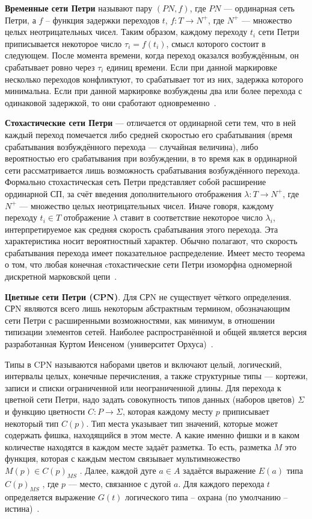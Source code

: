 \textbf{Временные сети Петри} называют пару $(PN, f)$, где $PN$ --- ординарная сеть Петри, а $f$ – функция задержки переходов $t$, $f : T \rightarrow N^+$, где $N^+$ --- множество целых неотрицательных чисел. Таким образом, каждому переходу $t_i$ сети Петри приписывается некоторое число $\tau_i = f(t_i)$, смысл которого состоит в следующем. После момента времени, когда переход оказался возбуждённым, он срабатывает ровно через $\tau_i$  единиц времени. Если при данной маркировке несколько переходов конфликтуют, то срабатывает тот из них, задержка которого минимальна. Если при данной маркировке возбуждены два или более перехода с одинаковой задержкой, то они сработают одновременно~\cite{timed_petri}.

\textbf{Стохастические сети Петри} --- отличается от ординарной сети тем, что в ней каждый переход помечается либо средней скоростью его срабатывания (время срабатывания возбуждённого перехода --- случайная величина), либо вероятностью его срабатывания при возбуждении, в то время как в ординарной сети рассматривается лишь возможность срабатывания возбуждённого перехода. Формально стохастическая сеть Петри представляет собой расширение ординарной СП, за счёт введения дополнительного отображения $\lambda : T \rightarrow N^+$, где $N^+$ --- множество целых неотрицательных чисел. Иначе говоря, каждому переходу $t_i \in T$ отображение $\lambda$ ставит в соответствие некоторое число $\lambda_i$, интерпретируемое как средняя скорость срабатывания этого перехода. Эта характеристика носит вероятностный характер. Обычно полагают, что скорость срабатывания перехода имеет показательное распределение. Имеет место теорема о том, что любая конечная cтохастические сети Петри изоморфна одномерной дискретной марковской цепи~\cite{timed_petri}.

\textbf{Цветные сети Петри (CPN)}. Для СРN не существует чёткого определения. СРN являются всего лишь некоторым абстрактным термином, обозначающим сети Петри с расширенными возможностями, как минимум, в отношении типизации элементов сетей. Наиболее распространённой и общей является версия разработанная Куртом Иенсеном (университет Орхуса)~\cite{cpnNoForm}. 

Типы в CPN называются наборами цветов и включают целый, логический, интервалы целых, конечные перечисления, а также структурные типы --- кортежи, записи и списки ограниченной или неограниченной длины. Для перехода к цветной сети Петри, надо задать совокупность типов данных (наборов цветов) $\Sigma$ и функцию цветности $C :P \rightarrow \Sigma$, которая каждому месту $p$ приписывает некоторый тип $C(p)$. Тип места указывает тип значений, которые может содержать фишка, находящийся в этом месте. А какие именно фишки и в каком количестве находятся в каждом месте задаёт разметка. То есть, разметка $M$ это функция, которая с каждым местом связывает мультимножество $M(p) \in C(p)_{MS}$ . Далее, каждой дуге $a \in A$ задаётся выражение $E(a)$ типа $C(p)_{MS}$ , где $p$ — место, связанное с дугой $a$. Для каждого перехода $t$ определяется выражение $G(t)$ логического типа -- охрана (по умолчанию -- истина)~\cite{cpn}.

